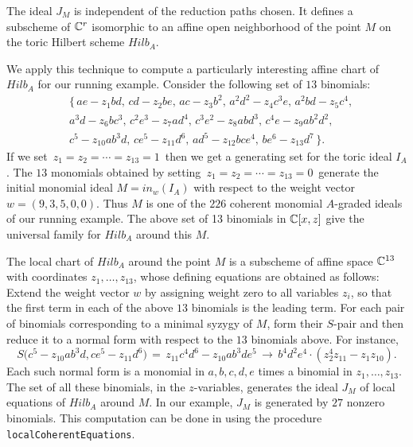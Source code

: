 \begin{proposition}[\cite{HS:PS2}]\label{localeqns}
The ideal $J_M$ is independent of the reduction paths chosen.
It defines a subscheme of $\mathbb{C}^r$ isomorphic to
an affine open neighborhood of the point $M$ on 
the toric Hilbert scheme $Hilb_A$.
\end{proposition}

We apply this technique to compute a particularly interesting affine
chart of $Hilb_A$ for our running example.
Consider the following set of $13$ binomials:
\begin{eqnarray*}
& \bigl\{ \,a e - z_1 b d ,  \,
 c d - z_2 b e , \,
 a c - z_3 b^2 , \,
 a^2 d^2 - z_4 c^3 e , \,
 a^2 b d - z_5 c^4 , \\ &
 a^3 d - z_6 b c^3 , \,
 c^2 e^3 - z_7 a d^4 , \, 
 c^3 e^2 - z_8 a b d^3 , \,
 c^4 e - z_9 a b^2 d^2 , \\ &
 c^5 - z_{10} a b^3 d , \,
 c e^5 - z_{11} d^6 , \,
 a d^5 - z_{12} b c e^4 , \,
 b e^6 - z_{13} d^7  \, \bigr\}.
\end{eqnarray*}
If we set $\, z_1 = z_2 = \cdots = z_{13} = 1\,$
then we get a generating set for the toric ideal $I_A$.
The $13$ monomials obtained by setting
$\, z_1 = z_2 = \cdots = z_{13} = 0 \,$
generate the initial monomial ideal $ M = in_w (I_A)$
with respect to the weight vector $w = (9, 3, 5, 0, 0)$.
Thus $M$ is one of the $226$ coherent monomial 
$A$-graded ideals of our running example. The above set of 
13 binomials in $\mathbb{C}[x,z]$ give the universal family 
for $Hilb_A$ around this $M$.

The local chart of $Hilb_A$ around the point $M$
is a subscheme of affine space $\mathbb{C}^{13}$ with coordinates 
$z_1, \ldots, z_{13}$, whose
defining equations are obtained as follows: 
Extend the weight vector $w$ by assigning
weight zero to all variables $z_i$, so that
the first term in each of the above $13$ binomials
is the leading term. For each pair of binomials corresponding to a  
minimal syzygy of $M$, form their $S$-pair and then reduce it to a 
normal form with respect to the $13$ binomials above.
For instance,
$$
S \bigl(
 c^5 - z_{10} a b^3 d , 
 c e^5 - z_{11} d^6 \bigr)
\, = \,
 z_{11} c^4 d^6  - z_{10} a b^3 d e^5
\, \longrightarrow \,
b^4 d^2 e^4 \cdot (z_2^4 z_{11} - z_1 z_{10}).
$$
Each such normal form is a monomial in $a,b,c,d,e$ times a binomial in
$z_1, \ldots, z_{13}$.  The set of all these binomials, in the
$z$-variables, generates the ideal $J_M$ of local equations of
$Hilb_A$ around $M$.  In our example, $J_M$ is generated by $27$
nonzero binomials.  This computation can be done in \Mtwo using the
procedure {\tt localCoherentEquations}.


